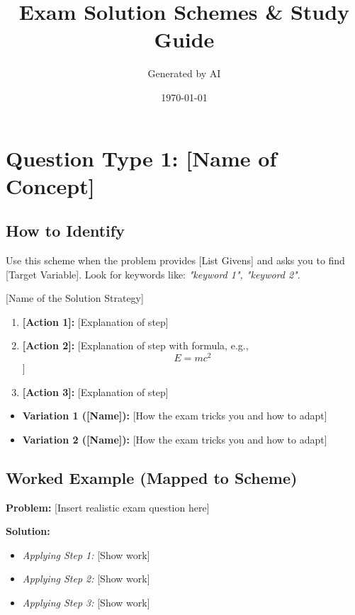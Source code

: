 \documentclass[12pt, a4paper]{article}
\begin{document}
\title{Exam Solution Schemes \& Study Guide}
\author{Generated by AI}
\date{\today}
\maketitle
\tableofcontents
\newpage


\section{Question Type 1: [Name of Concept]}

\subsection*{How to Identify}
Use this scheme when the problem provides [List Givens] and asks you to find [Target Variable]. Look for keywords like: \textit{"keyword 1", "keyword 2"}.

\begin{schemebox}{[Name of the Solution Strategy]}
\begin{enumerate}[label=\textbf{Step \arabic*:}, leftmargin=*]
    \item \textbf{[Action 1]:} [Explanation of step]
    \item \textbf{[Action 2]:} [Explanation of step with formula, e.g., \[E = mc^2\]]
    \item \textbf{[Action 3]:} [Explanation of step]
\end{enumerate}
\end{schemebox}

\begin{trapbox}
\begin{itemize}
    \item \textbf{Variation 1 ([Name]):} [How the exam tricks you and how to adapt]
    \item \textbf{Variation 2 ([Name]):} [How the exam tricks you and how to adapt]
\end{itemize}
\end{trapbox}

\subsection*{Worked Example (Mapped to Scheme)}
\textbf{Problem:} [Insert realistic exam question here]

\textbf{Solution:}
\begin{itemize}
    \item \textit{Applying Step 1:} [Show work]
    \item \textit{Applying Step 2:} [Show work]
    \item \textit{Applying Step 3:} [Show work]
\end{itemize}

\end{document}
